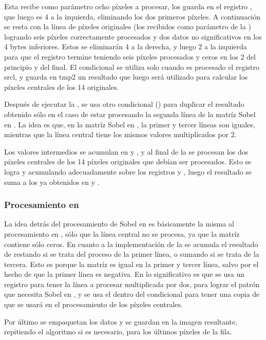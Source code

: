 	Esta  recibe como parámetro ocho píxeles a procesar, los guarda en el registro , que luego es  4 
 a la izquierda, eliminando los dos primeros píxeles. A continuación se resta con la línea de píxeles originales (los recibidos como 
parámetro de la ) logrando seis píxeles correctamente procesados y dos datos no significativos en los 4 bytes inferiores. Estos se 
eliminarán  4  a la derecha, y luego 2  a la izquierda para que el registro  termine 
teniendo seis píxeles procesados y ceros en los 2  del principio y del final. El condicional  se utiliza solo cuando 
es procesado el registro srcl, y guarda en tmp2 un resultado que luego será utilizado para calcular los píxeles centrales de los 14 originales.

Después de ejecutar la  , se usa otro condicional () para duplicar el resultado obtenido sólo en el caso de 
estar procesando la segunda línea de la matríz Sobel en . La idea es que, en la matríz Sobel en , la primer y tercer líneas son iguales, 
mientras que la línea central tiene los mismos valores multiplicados por 2.
   	
	Los valores intermedios se acumulan en  y , y al final de la  se procesan los dos píxeles centrales de los 14 píxeles 
originales que debían ser procesados. Esto se logra  y acumulando adecuadamente sobre los registros  y , luego 
el resultado se suma a los ya obtenidos en  y .

\subsubsection{Procesamiento en }
	La idea detrás del procesamiento de Sobel en  es básicamente la misma al procesamiento en , sólo que la línea central no se procesa, ya que 
la matríz contiene sólo ceros. En cuanto a la implementación de la   se acumula el resultado de  restando si se 
trata del proceso de la primer línea, o sumando si se trata de la tercera. Esto es porque la matríz es igual en la primer y tercer línea, salvo por el hecho de que la primer línea es negativa. En  lo significativo es que se usa un registro para tener la línea a procesar multiplicada por dos, para lograr el 
patrón que necesita Sobel en , y se usa el  dentro del condicional  para tener una copia de  que se usará en el 
procesamiento de los píxeles centrales.

	Por último se empaquetan los datos y se guardan en la imagen resultante, repitiendo el algoritmo si es necesario, para los últimos píxeles de la fila. 

\pagebreak

